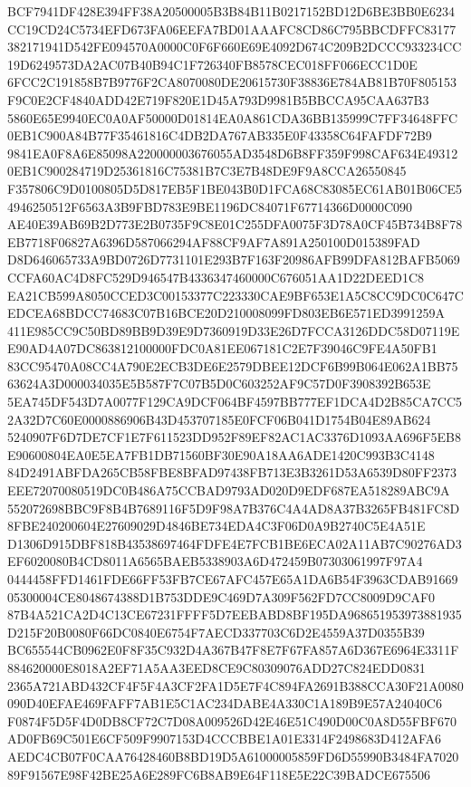 \documentclass[UTF8,fontset=fandol,zihao=-4,a4paper]{ctexart}
\begin{document}
{{BCF7941DF428E394FF38A20500005B3B84B11B0217152BD12D6BE3BB0E6234CC19CD24C5734EFD673FA06EEFA7BD01AAAFC8CD86C795BBCDFFC83177
382171941D542FE094570A0000C0F6F660E69E4092D674C209B2DCCC933234CC19D6249573DA2AC07B40B94C1F726340FB8578CEC018FF066ECC1D0E
6FCC2C191858B7B9776F2CA8070080DE20615730F38836E784AB81B70F805153F9C0E2CF4840ADD42E719F820E1D45A793D9981B5BBCCA95CAA637B3
5860E65E9940EC0A0AF50000D01814EA0A861CDA36BB135999C7FF34648FFC0EB1C900A84B77F35461816C4DB2DA767AB335E0F43358C64FAFDF72B9
9841EA0F8A6E85098A220000003676055AD3548D6B8FF359F998CAF634E493120EB1C900284719D25361816C75381B7C3E7B48DE9F9A8CCA26550845
F357806C9D0100805D5D817EB5F1BE043B0D1FCA68C83085EC61AB01B06CE54946250512F6563A3B9FBD783E9BE1196DC84071F67714366D0000C090
AE40E39AB69B2D773E2B0735F9C8E01C255DFA0075F3D78A0CF45B734B8F78EB7718F06827A6396D587066294AF88CF9AF7A891A250100D015389FAD
D8D646065733A9BD0726D7731101E293B7F163F20986AFB99DFA812BAFB5069CCFA60AC4D8FC529D946547B4336347460000C676051AA1D22DEED1C8
EA21CB599A8050CCED3C00153377C223330CAE9BF653E1A5C8CC9DC0C647CEDCEA68BDCC74683C07B16BCE20D210008099FD803EB6E571ED3991259A
411E985CC9C50BD89BB9D39E9D7360919D33E26D7FCCA3126DDC58D07119EE90AD4A07DC863812100000FDC0A81EE067181C2E7F39046C9FE4A50FB1
83CC95470A08CC4A790E2ECB3DE6E2579DBEE12DCF6B99B064E062A1BB7563624A3D000034035E5B587F7C07B5D0C603252AF9C57D0F3908392B653E
5EA745DF543D7A0077F129CA9DCF064BF4597BB777EF1DCA4D2B85CA7CC52A32D7C60E0000886906B43D453707185E0FCF06B041D1754B04E89AB624
5240907F6D7DE7CF1E7F611523DD952F89EF82AC1AC3376D1093AA696F5EB8E90600804EA0E5EA7FB1DB71560BF30E90A18AA6ADE1420C993B3C4148
84D2491ABFDA265CB58FBE8BFAD97438FB713E3B3261D53A6539D80FF2373EEE72070080519DC0B486A75CCBAD9793AD020D9EDF687EA518289ABC9A
552072698BBC9F8B4B7689116F5D9F98A7B376C4A4AD8A37B3265FB481FC8D8FBE240200604E27609029D4846BE734EDA4C3F06D0A9B2740C5E4A51E
D1306D915DBF818B43538697464FDFE4E7FCB1BE6ECA02A11AB7C90276AD3EF6020080B4CD8011A6565BAEB5338903A6D472459B07303061997F97A4
0444458FFD1461FDE66FF53FB7CE67AFC457E65A1DA6B54F3963CDAB9166905300004CE8048674388D1B753DDE9C469D7A309F562FD7CC8009D9CAF0
87B4A521CA2D4C13CE67231FFFF5D7EEBABD8BF195DA968651953973881935D215F20B0080F66DC0840E6754F7AECD337703C6D2E4559A37D0355B39
BC655544CB0962E0F8F35C932D4A367B47F8E7F67FA857A6D367E6964E3311F884620000E8018A2EF71A5AA3EED8CE9C80309076ADD27C824EDD0831
2365A721ABD432CF4F5F4A3CF2FA1D5E7F4C894FA2691B388CCA30F21A0080090D40EFAE469FAFF7AB1E5C1AC234DABE4A330C1A189B9E57A24040C6
F0874F5D5F4D0DB8CF72C7D08A009526D42E46E51C490D00C0A8D55FBF670AD0FB69C501E6CF509F9907153D4CCCBBE1A01E3314F2498683D412AFA6
AEDC4CB07F0CAA76428460B8BD19D5A61000005859FD6D55990B3484FA702089F91567E98F42BE25A6E289FC6B8AB9E64F118E5E22C39BADCE675506
}}
\end{document}
